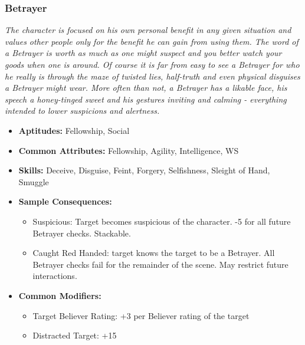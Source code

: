 \subsubsection{Betrayer}\label{Betrayer}
\textit{The character is focused on his own personal benefit in any given situation and values other people only for the benefit he can gain from using them.
The word of a Betrayer is worth as much as one might suspect and you better watch your goods when one is around.
Of course it is far from easy to see a Betrayer for who he really is through the maze of twisted lies, half-truth and even physical disguises a Betrayer might wear.
More often than not, a Betrayer has a likable face, his speech a honey-tinged sweet and his gestures inviting and calming - everything intended to lower suspicions and alertness.}
\begin{itemize}
	\item \textbf{Aptitudes:} Fellowship, Social
	\item \textbf{Common Attributes:}  Fellowship, Agility, Intelligence, WS
	\item \textbf{Skills:} Deceive, Disguise, Feint, Forgery, Selfishness, Sleight of Hand, Smuggle
	\item \textbf{Sample Consequences:} 
	\begin{itemize}
		\item Suspicious: Target becomes suspicious of the character. -5 for all future Betrayer checks. Stackable.
		\item Caught Red Handed: target knows the target to be a Betrayer. All Betrayer checks fail for the remainder of the scene. May restrict future interactions.
	\end{itemize}
	\item \textbf{Common Modifiers:}
	\begin{itemize}
		\item Target Believer Rating: +3 per Believer rating of the target
		\item Distracted Target: +15
	\end{itemize}
\end{itemize}

